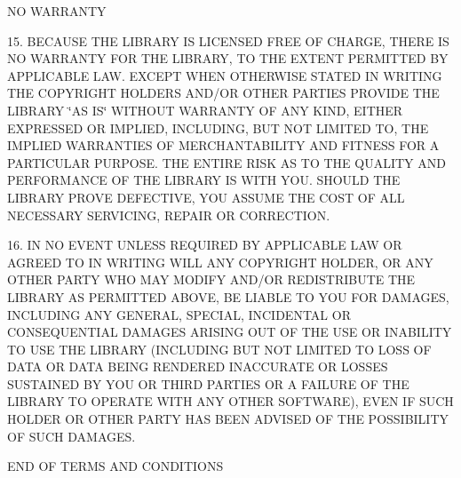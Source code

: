 NO WARRANTY

15. BECAUSE THE LIBRARY IS LICENSED FREE OF CHARGE, THERE IS NO WARRANTY FOR THE LIBRARY, TO THE EXTENT PERMITTED BY APPLICABLE LAW. EXCEPT WHEN OTHERWISE STATED IN WRITING THE COPYRIGHT HOLDERS AND/OR OTHER PARTIES PROVIDE THE LIBRARY \char`\"{}AS IS\char`\"{} WITHOUT WARRANTY OF ANY KIND, EITHER EXPRESSED OR IMPLIED, INCLUDING, BUT NOT LIMITED TO, THE IMPLIED WARRANTIES OF MERCHANTABILITY AND FITNESS FOR A PARTICULAR PURPOSE. THE ENTIRE RISK AS TO THE QUALITY AND PERFORMANCE OF THE LIBRARY IS WITH YOU. SHOULD THE LIBRARY PROVE DEFECTIVE, YOU ASSUME THE COST OF ALL NECESSARY SERVICING, REPAIR OR CORRECTION.

16. IN NO EVENT UNLESS REQUIRED BY APPLICABLE LAW OR AGREED TO IN WRITING WILL ANY COPYRIGHT HOLDER, OR ANY OTHER PARTY WHO MAY MODIFY AND/OR REDISTRIBUTE THE LIBRARY AS PERMITTED ABOVE, BE LIABLE TO YOU FOR DAMAGES, INCLUDING ANY GENERAL, SPECIAL, INCIDENTAL OR CONSEQUENTIAL DAMAGES ARISING OUT OF THE USE OR INABILITY TO USE THE LIBRARY (INCLUDING BUT NOT LIMITED TO LOSS OF DATA OR DATA BEING RENDERED INACCURATE OR LOSSES SUSTAINED BY YOU OR THIRD PARTIES OR A FAILURE OF THE LIBRARY TO OPERATE WITH ANY OTHER SOFTWARE), EVEN IF SUCH HOLDER OR OTHER PARTY HAS BEEN ADVISED OF THE POSSIBILITY OF SUCH DAMAGES.

END OF TERMS AND CONDITIONS 